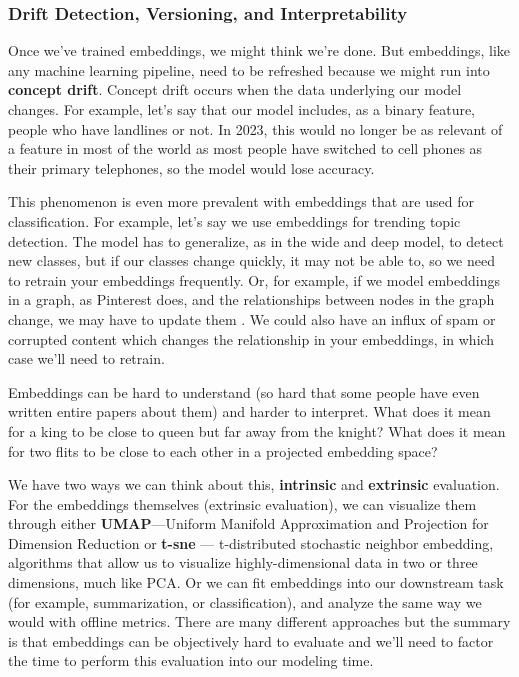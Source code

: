 \documentclass[11pt, table]{diazessay} %
\begin{document}
\begin{sloppypar}
\subsubsection{Drift Detection, Versioning, and Interpretability}

Once we've trained embeddings, we might think we're done. But embeddings, like any machine learning pipeline, need to be refreshed because we might run into \textbf{concept drift}. Concept drift occurs when the data underlying our model changes. For example, let's say that our model includes, as a binary feature, people who have landlines or not. In 2023, this would no longer be as relevant of a feature in most of the world as most people have switched to cell phones as their primary telephones, so the model would lose accuracy.

This phenomenon is even more prevalent with embeddings that are used for classification. For example, let's say we use embeddings for trending topic detection. The model has to generalize, as in the wide and deep model, to detect new classes, but if our classes change quickly, it may not be able to, so we need to retrain your embeddings frequently. Or, for example, if we model embeddings in a graph, as Pinterest does, and the relationships between nodes in the graph change, we may have to update them \citep{wewer2021updating}. We could also have an influx of spam or corrupted content which changes the relationship in your embeddings, in which case we'll need to retrain.

Embeddings can be hard to understand (so hard that some people have even written entire papers about them) and harder to interpret. What does it mean for a king to be close to queen but far away from the knight? What does it mean for two flits to be close to each other in a projected embedding space?  

We have two ways we can think about this, \textbf{intrinsic} and \textbf{extrinsic} evaluation. For the embeddings themselves (extrinsic evaluation), we can visualize them through either \textbf{UMAP}---Uniform Manifold Approximation and Projection for Dimension Reduction or \textbf{t-sne} --- t-distributed stochastic neighbor embedding, algorithms that allow us to visualize highly-dimensional data in two or three dimensions, much like PCA. Or we can fit embeddings into our downstream task (for example, summarization, or classification), and analyze the same way we would with offline metrics. There are many different approaches
 \citep{wang2019evaluating} but the summary is that embeddings can be objectively hard to evaluate and we'll need to factor the time to perform this evaluation into our modeling time.


\end{sloppypar}
\end{document}
